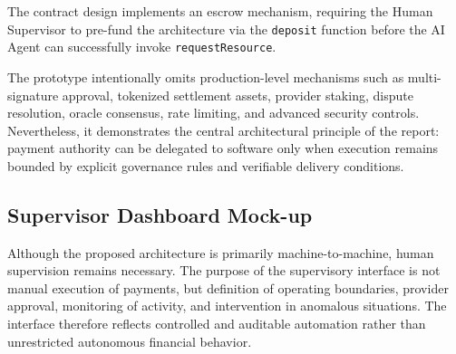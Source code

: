 \documentclass[12pt,a4paper,oneside]{article}
\theoremstyle{definition}
\theoremstyle{plain}
\begin{document}
The contract design implements an escrow mechanism, requiring the Human Supervisor to pre-fund the architecture via the \texttt{deposit} function before the AI Agent can successfully invoke \texttt{requestResource}.

The prototype intentionally omits production-level mechanisms such as multi-signature approval, tokenized settlement assets, provider staking, dispute resolution, oracle consensus, rate limiting, and advanced security controls. Nevertheless, it demonstrates the central architectural principle of the report: payment authority can be delegated to software only when execution remains bounded by explicit governance rules and verifiable delivery conditions.

\subsection{Supervisor Dashboard Mock-up}

Although the proposed architecture is primarily machine-to-machine, human supervision remains necessary. The purpose of the supervisory interface is not manual execution of payments, but definition of operating boundaries, provider approval, monitoring of activity, and intervention in anomalous situations. The interface therefore reflects controlled and auditable automation rather than unrestricted autonomous financial behavior.
\end{document}
